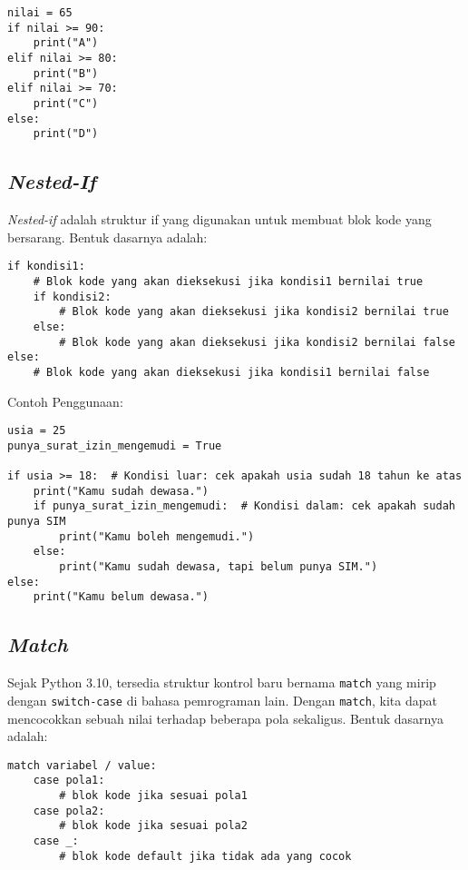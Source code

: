 \begin{lstlisting}[style=PythonStyle, caption={Kode Python: if_elif_else_statement.py}]
nilai = 65
if nilai >= 90:
    print("A")
elif nilai >= 80:
    print("B")
elif nilai >= 70:
    print("C")
else:
    print("D")
\end{lstlisting}

\subsection{\textit{Nested-If}}
\textit{Nested-if} adalah struktur if yang digunakan untuk membuat blok kode yang bersarang. Bentuk dasarnya adalah:

\begin{lstlisting}[style=PythonStyle, caption={Bentuk dasar nested-if}]
if kondisi1:
    # Blok kode yang akan dieksekusi jika kondisi1 bernilai true
    if kondisi2:
        # Blok kode yang akan dieksekusi jika kondisi2 bernilai true
    else:
        # Blok kode yang akan dieksekusi jika kondisi2 bernilai false
else:
    # Blok kode yang akan dieksekusi jika kondisi1 bernilai false
\end{lstlisting}

Contoh Penggunaan:

\begin{lstlisting}[style=PythonStyle, caption={Kode Python: nested_if_statement.py}]
usia = 25
punya_surat_izin_mengemudi = True

if usia >= 18:  # Kondisi luar: cek apakah usia sudah 18 tahun ke atas
    print("Kamu sudah dewasa.")
    if punya_surat_izin_mengemudi:  # Kondisi dalam: cek apakah sudah punya SIM
        print("Kamu boleh mengemudi.")
    else:
        print("Kamu sudah dewasa, tapi belum punya SIM.")
else:
    print("Kamu belum dewasa.")
\end{lstlisting}

\subsection{\textit{Match}}
Sejak Python 3.10, tersedia struktur kontrol baru bernama \texttt{match} yang mirip dengan \texttt{switch-case} di bahasa pemrograman lain. Dengan \texttt{match}, kita dapat mencocokkan sebuah nilai terhadap beberapa pola sekaligus. Bentuk dasarnya adalah:

\begin{lstlisting}[style=PythonStyle, caption={Bentuk dasar match}]
match variabel / value:
    case pola1:
        # blok kode jika sesuai pola1
    case pola2:
        # blok kode jika sesuai pola2
    case _:
        # blok kode default jika tidak ada yang cocok
\end{lstlisting}


